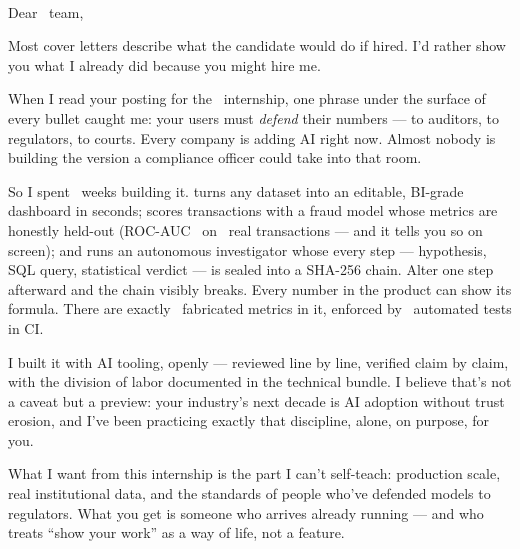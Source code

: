 \documentclass[11pt]{article}
\begin{document}

{\DisplayFont\SizeTitle{\MyName}}\\[-1.5mm]
{\AccentFont\lsstyle{}}

\vspace{6mm}

Dear \TheCompany\ team,

Most cover letters describe what the candidate would do if hired. I'd rather show
you what I already did because you might hire me.

When I read your posting for the \TheTeam\ internship, one phrase under the surface
of every bullet caught me: your users must \emph{defend} their numbers — to auditors,
to regulators, to courts. Every company is adding AI right now. Almost nobody is
building the version a compliance officer could take into that room.

So I spent \BuildWeeks\ weeks building it. \textbf{\ProjectName} turns any dataset
into an editable, BI-grade dashboard in seconds; scores transactions with a fraud
model whose metrics are honestly held-out (ROC-AUC \StatRocAuc\ on \StatTxns\ real
transactions — and it tells you so on screen); and runs an autonomous investigator
whose every step — hypothesis, SQL query, statistical verdict — is sealed into a
SHA-256 chain. Alter one step afterward and the chain visibly breaks. Every number
in the product can show its formula. There are exactly \StatFabricated\ fabricated
metrics in it, enforced by \StatTests\ automated tests in CI.

I built it with AI tooling, openly — reviewed line by line, verified claim by
claim, with the division of labor documented in the technical bundle. I believe
that's not a caveat but a preview: your industry's next decade is AI adoption
without trust erosion, and I've been practicing exactly that discipline, alone, on
purpose, for you.

What I want from this internship is the part I can't self-teach: production scale,
real institutional data, and the standards of people who've defended models to
regulators. What you get is someone who arrives already running — and who treats
“show your work” as a way of life, not a feature.
\end{document}
